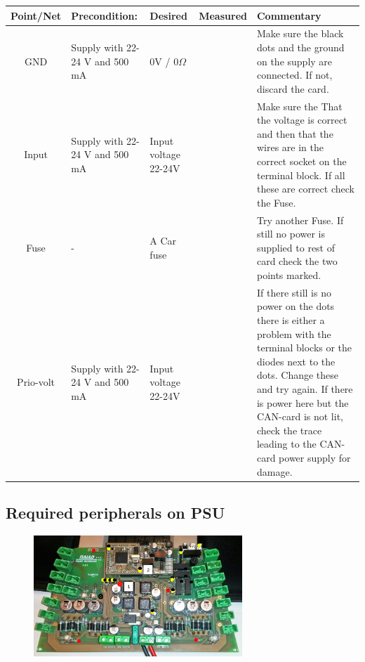 \begin{table}[ht]
\begin{tabularx}{\textwidth}{|c|>{\hsize=0.6\hsize}X|>{\hsize=0.6\hsize}X|c|>{\hsize=1.8\hsize}X|} %
\hline 
Point/Net & Precondition: & Desired & Measured & Commentary \\ 
\hline 
GND & Supply with 22-24 V and 500 mA & 0V / 0$\Omega$ &   & Make sure the black dots and the ground on the supply are connected. If not, discard the card.  \\ 
\hline 
Input & Supply with 22-24 V and 500 mA & Input voltage 22-24V &    & Make sure the That the voltage is correct and then that the wires are in the correct socket on the terminal block. If all these are correct check the Fuse.   \\ 
\hline 
Fuse & - & 30 A Car fuse &   & Try another Fuse. If still no power is supplied to rest of card check the two points marked.  \\ 
\hline 
Prio-volt & Supply with 22-24 V and 500 mA & Input voltage 22-24V &    & If there still is no power on the dots there is either a problem with the terminal blocks or the diodes next to the dots. Change these and try again. If there is power here but the CAN-card is not lit, check the trace leading to the CAN-card power supply for damage.  \\ 
\hline
\end{tabularx}
\end{table}

\newpage
\subsection{Required peripherals on PSU}
\begin{figure}[!ht]
	\begin{center}
		\includegraphics[width=0.7\textwidth]{./Images/Unit_test_power_board/peripherals.jpg}
		\label{peripherals}
	\end{center}
\end{figure}

